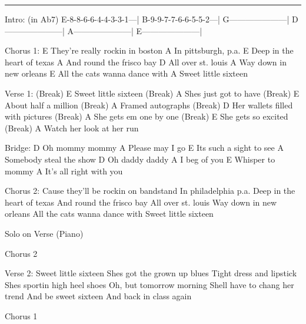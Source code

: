 \noindent\rule{\columnwidth}{1pt}

\begin{multicols}{2}
\begin{lsttab}
Intro: (in Ab7)
E-8-8-6-6-4-4-3-3-1---|
B-9-9-7-7-6-6-5-5-2---|
G---------------------|
D---------------------|
A---------------------|
E---------------------|
\end{lsttab}
\begin{lstsong}
Chorus 1:
                         E
They're really rockin in boston
                  A
In pittsburgh, p.a.
                      E
Deep in the heart of texas
                        A
And round the frisco bay
              D
All over st. louis
                       A
Way down in new orleans
                   E
All the cats wanna dance with
                 A                 
Sweet little sixteen

Verse 1:
(Break)         E
Sweet little sixteen
(Break)              A
Shes just got to have
(Break)          E
About half a million
(Break)          A
Framed autographs
(Break)                  D
Her wallets filled with pictures
(Break)               A
She gets em one by one
(Break)        E
She gets so excited
(Break)                  A
Watch her look at her run








Bridge:
         D
Oh mommy mommy
             A
Please may I go
                        E
Its such a sight to see
                        A
Somebody steal the show
          D
Oh daddy daddy
             A
I beg of you
           E
Whisper to mommy
                      A
It's all right with you

Chorus 2:
Cause they'll be rockin on bandstand
In philadelphia p.a.
Deep in the heart of texas
And round the frisco bay
All over st. louis
Way down in new orleans
All the cats wanna dance with
Sweet little sixteen

Solo on Verse (Piano)

Chorus 2

Verse 2:
Sweet little sixteen
Shes got the grown up blues
Tight dress and lipstick
Shes sportin high heel shoes
Oh, but tomorrow morning
Shell have to chang her trend
And be sweet sixteen
And back in class again

Chorus 1
\end{lstsong}
\end{multicols}
\newpage

